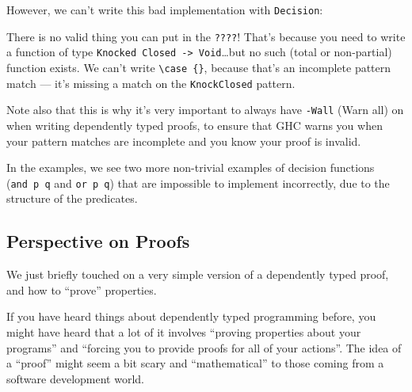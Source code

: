 \documentclass[]{article}
\newenvironment{Shaded}{}{}
\newcommand{\CommentTok}[1]{\textcolor[rgb]{0.38,0.63,0.69}{\textit{#1}}}
\newcommand{\DataTypeTok}[1]{\textcolor[rgb]{0.56,0.13,0.00}{#1}}
\newcommand{\FunctionTok}[1]{\textcolor[rgb]{0.02,0.16,0.49}{#1}}
\newcommand{\KeywordTok}[1]{\textcolor[rgb]{0.00,0.44,0.13}{\textbf{#1}}}
\newcommand{\NormalTok}[1]{#1}
\newcommand{\OtherTok}[1]{\textcolor[rgb]{0.00,0.44,0.13}{#1}}
\begin{document}
However, we can't write this bad implementation with \texttt{Decision}:

\begin{Shaded}
\end{Shaded}

There is no valid thing you can put in the \texttt{????}! That's because you
need to write a function of type
\texttt{Knocked\ \textquotesingle{}Closed\ -\textgreater{}\ Void}\ldots{}but no
such (total or non-partial) function exists. We can't write
\texttt{\textbackslash{}case\ \{\}}, because that's an incomplete pattern match
--- it's missing a match on the \texttt{KnockClosed} pattern.

Note also that this is why it's very important to always have \texttt{-Wall}
(Warn all) on when writing dependently typed proofs, to ensure that GHC warns
you when your pattern matches are incomplete and you know your proof is invalid.

In the examples, we see two more non-trivial examples of decision functions
(\texttt{and\ p\ q} and \texttt{or\ p\ q}) that are impossible to implement
incorrectly, due to the structure of the predicates.

\hypertarget{perspective-on-proofs}{%
\subsection{Perspective on Proofs}\label{perspective-on-proofs}}

We just briefly touched on a very simple version of a dependently typed proof,
and how to ``prove'' properties.

If you have heard things about dependently typed programming before, you might
have heard that a lot of it involves ``proving properties about your programs''
and ``forcing you to provide proofs for all of your actions''. The idea of a
``proof'' might seem a bit scary and ``mathematical'' to those coming from a
software development world.
\end{document}
